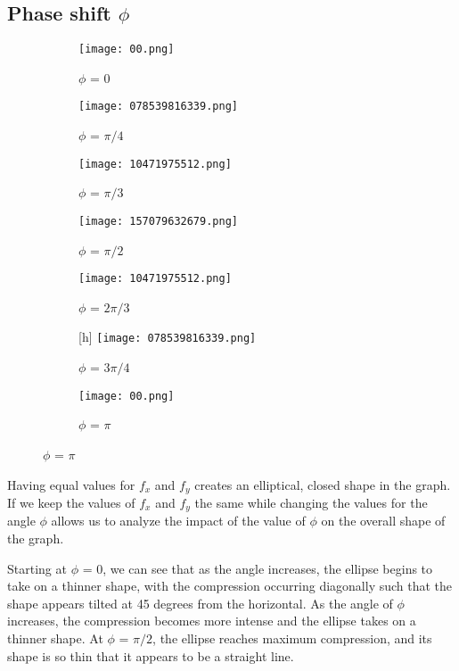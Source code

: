 \documentclass{article}
\begin{document}
\subsection{Phase shift $\phi$}

\begin{figure}
    \caption{$\Phi$ investigation}
    \label{Phi}

\begin{subfigure}{0.5\textwidth}
    \centering
    \texttt{[image: 00.png]}
    \caption{$\phi$ = 0}
    \label{pi0}
\end{subfigure}
\begin{subfigure}{0.5\textwidth}
    \centering
    \texttt{[image: 078539816339.png]}
    \caption{$\phi$ = $\pi/4$}
    \label{pi4}
\end{subfigure}
\begin{subfigure}{0.5\textwidth}
    \centering
    \texttt{[image: 10471975512.png]}
    \caption{$\phi$ = $\pi/3$}
    \label{pi3}
\end{subfigure}  
\begin{subfigure}{0.5\textwidth}
    \centering
    \texttt{[image: 157079632679.png]}
    \caption{$\phi$ = $\pi/2$}
    \label{pi}
\end{subfigure}
\begin{subfigure}{0.5\textwidth}
    \centering
    \texttt{[image: 10471975512.png]}
    \caption{$\phi$ = $2\pi/3$}
    \label{2pi3}
\end{subfigure}
\begin{subfigure}{0.5\textwidth}[h]
    \centering
    \texttt{[image: 078539816339.png]}
    \caption{$\phi$ = $3\pi/4$}
    \label{3pi4}
\end{subfigure}
\begin{subfigure}{0.5\textwidth}
    \centering
    \texttt{[image: 00.png]}
    \caption{$\phi$ = $\pi$}
    \label{pi}
\end{subfigure}
    
\end{figure}


Having equal values for $f_x$ and $f_y$ creates an elliptical, closed shape in the graph. If we keep the values of $f_x$ and $f_y$ the same while changing the values for the angle $\phi$ allows us to analyze the impact of the value of $\phi$ on the overall shape of the graph. 

Starting at $\phi$ = 0, we can see that as the angle increases, the ellipse begins to take on a thinner shape, with the compression occurring diagonally such that the shape appears tilted at 45 degrees from the horizontal. As the angle of $\phi$ increases, the compression becomes more intense and the ellipse takes on a thinner shape. At $\phi$ = $\pi/2$, the ellipse reaches maximum compression, and its shape is so thin that it appears to be a straight line. 
\end{document}
